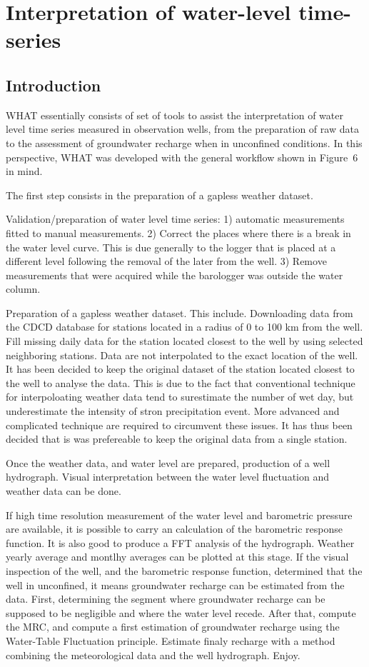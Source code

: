 \documentclass[12pt, letterpaper, fleqn]{report}
\begin{document}
\section{Interpretation of water-level time-series}

\subsection{Introduction}

WHAT essentially consists of set of tools to assist the interpretation of water level time series measured in observation wells, from the preparation of raw data to the assessment of groundwater recharge when in unconfined conditions. In this perspective, WHAT was developed with the general workflow shown in Figure 6  in mind.

The first step consists in the preparation of a gapless weather dataset.

Validation/preparation of water level time series: 1) automatic measurements fitted to manual measurements. 2) Correct the places where there is a break in the water level curve. This is due generally to the logger that is placed at a different level following the removal of the later from the well. 3) Remove measurements that were acquired while the barologger was outside the water column.

Preparation of a gapless weather dataset. This include. Downloading data from the CDCD database for stations located in a radius of 0 to 100 km from the well. Fill missing daily data for the station located closest to the well by using selected neighboring stations. Data are not interpolated to the exact location of the well. It has been decided to keep the original dataset of the station located closest to the well to analyse the data. This is due to the fact that conventional technique for interpoloating weather data tend to surestimate the number of wet day, but underestimate the intensity of stron precipitation event. More advanced and complicated technique are required to circumvent these issues. It has thus been decided that is was prefereable to keep the original data from a single station.

Once the weather data, and water level are prepared, production of a well hydrograph. Visual interpretation between the water level  fluctuation and weather data can be done.

If high time resolution measurement of the water level and barometric pressure are available, it is possible to carry an calculation of the barometric response function. It is also good to produce a FFT analysis of the hydrograph.
Weather yearly average and montlhy averages can be plotted at this stage.
If the visual inspection of the well, and the barometric response function, determined that the well in unconfined, it means groundwater recharge can be estimated from the data. First, determining the segment where groundwater recharge can be supposed to be negligible and where the water level recede. After that, compute the MRC, and compute a first estimation of groundwater recharge using the Water-Table Fluctuation principle. Estimate finaly recharge with a method combining the meteorological data and the well hydrograph. Enjoy.
\end{document}
